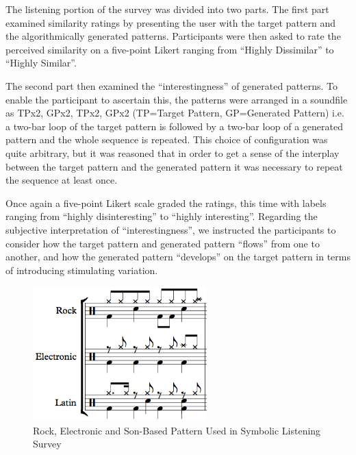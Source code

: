 The listening portion of the survey was divided into two parts. The first part examined similarity ratings by presenting the user with the target pattern and the algorithmically generated patterns. Participants were then asked to rate the perceived similarity on a five-point Likert ranging from “Highly Dissimilar” to “Highly Similar”.

The second part then examined the “interestingness” of generated patterns. To enable the participant to ascertain this, the  patterns were arranged in a soundfile as TPx2, GPx2, TPx2, GPx2 (TP=Target Pattern, GP=Generated Pattern) i.e. a two-bar loop of the target pattern is followed by a two-bar loop of a generated pattern and the whole sequence is repeated. This choice of configuration was quite arbitrary, but it was reasoned that in order to get a sense of the interplay between the target pattern and the generated pattern it was necessary to repeat the sequence at least once.

Once again a five-point Likert scale graded the ratings, this time with labels ranging from ``highly disinteresting'' to ``highly interesting''. Regarding the subjective interpretation of ``interestingness'', we instructed the participants to consider how the target pattern and generated pattern ``flows'' from one to another, and how the generated pattern ``develops'' on the target pattern in terms of introducing stimulating variation.

\begin{figure}
	\begin{center}
		\includegraphics[width=0.6\textwidth]{ch03_symbolic/figures/patterns.png}
	\end{center}
	\caption[Rock, Electronic and Son-Based Pattern Used in Symbolic Listening Survey]{Rock, Electronic and Son-Based Pattern Used in Symbolic Listening Survey}
	\label{fig:symbolic_patterns}
\end{figure}

